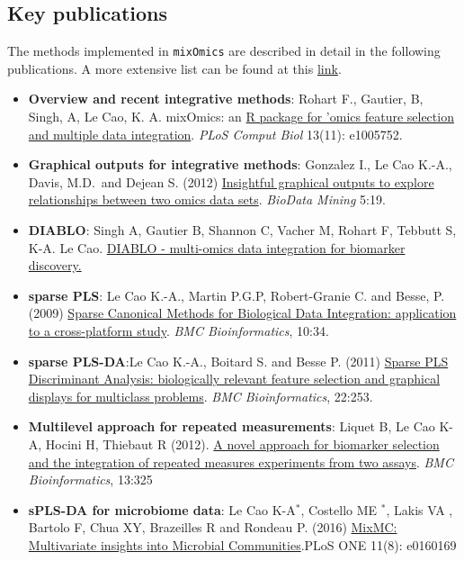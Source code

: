 \documentclass[]{book}
\begin{document}
\hypertarget{intro:pubs}{%
\subsection{Key publications}\label{intro:pubs}}

The methods implemented in \texttt{mixOmics} are described in detail in the following publications. A more extensive list can be found at this \href{http://mixomics.org/a-propos/publications/}{link}.

\begin{itemize}
\item
  \textbf{Overview and recent integrative methods}: Rohart F., Gautier, B, Singh, A, Le Cao, K. A. mixOmics: an \href{http://journals.plos.org/ploscompbiol/article?id=10.1371/journal.pcbi.1005752}{R package for 'omics feature selection and multiple data integration}. \emph{PLoS Comput Biol} 13(11): e1005752.
\item
  \textbf{Graphical outputs for integrative methods}: \citep{Gon12} Gonzalez I., Le Cao K.-A., Davis, M.D.~and Dejean S. (2012) \href{https://biodatamining.biomedcentral.com/articles/10.1186/1756-0381-5-19}{Insightful graphical outputs to explore relationships between two omics data sets}. \emph{BioData Mining} 5:19.
\item
  \textbf{DIABLO}: Singh A, Gautier B, Shannon C, Vacher M, Rohart F, Tebbutt S, K-A. Le Cao. \href{https://www.biorxiv.org/content/early/2018/03/20/067611}{DIABLO - multi-omics data integration for biomarker discovery.}
\item
  \textbf{sparse PLS}: Le Cao K.-A., Martin P.G.P, Robert-Granie C. and Besse, P. (2009) \href{http://www.biomedcentral.com/1471-2105/10/34/}{Sparse Canonical Methods for Biological Data Integration: application to a cross-platform study}. \emph{BMC Bioinformatics}, 10:34.
\item
  \textbf{sparse PLS-DA}:Le Cao K.-A., Boitard S. and Besse P. (2011) \href{https://bmcbioinformatics.biomedcentral.com/articles/10.1186/1471-2105-12-253}{Sparse PLS Discriminant Analysis: biologically relevant feature selection and graphical displays for multiclass problems}. \emph{BMC Bioinformatics}, 22:253.
\item
  \textbf{Multilevel approach for repeated measurements}: Liquet B, Le Cao K-A, Hocini H, Thiebaut R (2012). \href{https://bmcbioinformatics.biomedcentral.com/articles/10.1186/1471-2105-13-325}{A novel approach for biomarker selection and the integration of repeated measures experiments from two assays}. \emph{BMC Bioinformatics}, 13:325
\item
  \textbf{sPLS-DA for microbiome data}: Le Cao K-A\(^*\), Costello ME \(^*\), Lakis VA , Bartolo F, Chua XY, Brazeilles R and Rondeau P. (2016) \href{http://journals.plos.org/plosone/article?id=10.1371/journal.pone.0160169}{MixMC: Multivariate insights into Microbial Communities}.PLoS ONE 11(8): e0160169
\end{itemize}
\end{document}
